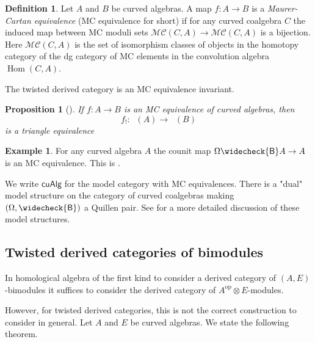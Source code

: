 \documentclass[a4paper]{amsart}
\theoremstyle{plain}
\newtheorem{prop}[thm]{Proposition}
\theoremstyle{definition}
\newtheorem{defn}[thm]{Definition}
\newtheorem{exmp}[thm]{Example}
\theoremstyle{remark}
\DeclareMathOperator{\DII}{D^{{II}}}%
\DeclareMathOperator{\Hom}{Hom}
\newcommand{\op}{\mathrm{op}}
\newcommand{\cat}[1]{\mathsf{#1}}
\newcommand{\cuAlg}{\cat{cuAlg}}
\newcommand{\cB}{\widecheck{\mathsf{B}}}
\numberwithin{equation}{section}
\theoremstyle{plain}
\begin{document}
	\begin{defn}\label{D:mc}
		Let $A$ and $B$ be curved algebras.
		A map $f \colon A \to B$ is a \emph{Maurer-Cartan equivalence} (MC equivalence for short) if for any curved coalgebra $C$ the induced map between MC moduli sets $\mathcal{MC}(C,A) \to \mathcal{MC}(C,A)$ is a bijection.
		Here $\mathcal{MC}(C,A)$ is the set of isomorphism classes of objects in the homotopy category of the dg category of MC elements in the convolution algebra $\Hom(C,A)$.
	\end{defn}
	The twisted derived category is an MC equivalence invariant.
	\begin{prop}[\cite{bl23}]\label{prop:mcd2}
		If $f:A\to B$ is an MC equivalence of curved algebras, then
		$$f_!:\DII(A)\to \DII(B)$$
		is a triangle equivalence
	\end{prop}
	
	\begin{exmp}\label{exmp:cobarbar}
		For any curved algebra $A$ the counit map $\Omega \cB A \to A$ is an MC equivalence. This is \cite[Theorem 6.4]{bl23}. 
	\end{exmp}
	
	
	We write $\cuAlg$ for the model category with MC equivalences. There is a "dual" model structure on the category of curved coalgebras making $(\Omega,\cB)$ a Quillen pair. See \cite[Section 6]{bl23} for a more detailed discussion of these model structures.
	\subsection{Twisted derived categories of bimodules}
	
	In homological algebra of the first kind to consider a derived category of $(A, E)$-bimodules it suffices to consider the derived category of $A^\op\otimes E$-modules.
	
	However, for twisted derived categories, this is not the correct construction to consider in general. 
		Let $A$ and $E$ be curved algebras.
	We state the following theorem.
	
\end{document}

